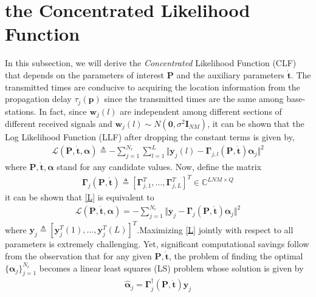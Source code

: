 \documentclass[review]{elsarticle}
\begin{document}
\section{the Concentrated Likelihood Function}
In this subsection, we will derive the \emph{Concentrated} Likelihood Function (CLF) that depends on the parameters of interest $\boldsymbol{P}$ and the auxiliary parameters $\mathring{\boldsymbol{t}}$. The transmitted times are conducive to acquiring the location information from the propagation delay $\tau_j(\boldsymbol{p})$ since the transmitted times are the same among base-stations. In fact, since $\boldsymbol{w}_j(l)$ are independent among different sections of different received signals and $\boldsymbol{w}_j(l)\sim N(\boldsymbol{0},\sigma^2\boldsymbol{I}_{NM})$, it can be shown that the Log Likelihood Function (LLF) after dropping the constant terms is given by,
\begin{align}
\mathcal{L}(\boldsymbol{P},\mathring{\boldsymbol{t}},\boldsymbol{\alpha})\triangleq-\sum_{j=1}^{N_r}\sum_{l=1}^L\Vert \boldsymbol{y}_j(l)-\boldsymbol{\Gamma}_{j,l}(\boldsymbol{P},\mathring{\boldsymbol{t}})\boldsymbol{\alpha}_j\Vert^2
\end{align}
where $\boldsymbol{P},\mathring{\boldsymbol{t}},\boldsymbol{\alpha}$ stand for any candidate values. Now, define the matrix
\begin{align}\label{Gammaj}
    \boldsymbol{\Gamma}_{j}(\boldsymbol{P},\mathring{\boldsymbol{t}})\triangleq[\boldsymbol{\Gamma}_{j,1}^T,...,\boldsymbol{\Gamma}_{j,L}^T]^T\in \mathbb{C}^{LNM\times Q}
\end{align}
it can be shown that \eqref{L} is equivalent to 
\begin{align}\label{L}
    \mathcal{L}(\boldsymbol{P},\mathring{\boldsymbol{t}},\boldsymbol{\alpha})=-\sum_{j=1}^{N_r}\Vert \boldsymbol{y}_j-\boldsymbol{\Gamma}_{j}(\boldsymbol{P},\mathring{\boldsymbol{t}})\boldsymbol{\alpha}_j\Vert^2
\end{align}
where $\boldsymbol{y}_j\triangleq[\boldsymbol{y}_j^T(1),...,\boldsymbol{y}_j^T(L)]^T$.Maximizing \eqref{L} jointly with respect to all parameters is extremely challenging. Yet, significant computational savings follow from the observation that for any given $\boldsymbol{P},\mathring{\boldsymbol{t}}$, the problem of finding the optimal $\lbrace \boldsymbol{\alpha}_j\rbrace _{j=1}^{N_r}$ becomes a linear least squares (LS) problem \cite{Golub1973The} whose solution is given by
\begin{align}
    \hat{\boldsymbol{\alpha}}_j=\boldsymbol{\Gamma}_{j}^\dagger(\boldsymbol{P},\mathring{\boldsymbol{t}})\boldsymbol{y}_j
\end{align}
\end{document}
